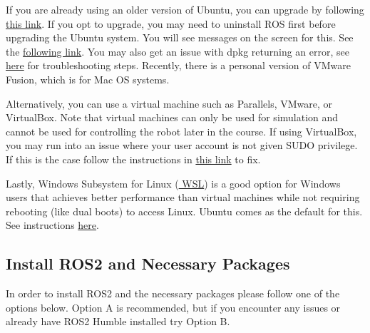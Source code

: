 \documentclass[hidelinks]{article}
\begin{document}
\vspace{0.1in}

If you are already using an older version of Ubuntu, you can upgrade by following \href{https://ubuntu.com/server/docs/upgrade-introduction}{\color{blue}this link}. If you opt to upgrade, you may need to uninstall ROS first before upgrading the Ubuntu system. You will see messages on the screen for this. See the \href{https://answers.ros.org/question/57213/how-i-completely-remove-all-ros-from-my-system/}{\color{blue}following link}. You may also get an issue with dpkg returning an error, see \href{https://phoenixnap.com/kb/fix-sub-process-usr-bin-dpkg-returned-error-code-1}{\color{blue}here} for troubleshooting steps. Recently, there is a personal version of VMware Fusion, which is for Mac OS systems.

\vspace{0.1in}

Alternatively, you can use a virtual machine such as Parallels, VMware, or VirtualBox. Note that virtual machines can only be used for simulation and cannot be used for controlling the robot later in the course. If using VirtualBox, you may run into an issue where your user account is not given SUDO privilege. If this is the case follow the instructions in \href{https://superuser.com/a/1755286}{\color{blue}this link} to fix.

\vspace{0.1in}

Lastly, Windows Subsystem for Linux (\href{https://learn.microsoft.com/en-us/windows/wsl/}{\color{blue} WSL}) is a good option for Windows users that achieves better performance than virtual machines while not requiring rebooting (like dual boots) to access Linux. Ubuntu comes as the default for this. See instructions \href{https://learn.microsoft.com/en-us/windows/wsl/install}{\color{blue} here}.

\subsection{Install ROS2 and Necessary Packages}
In order to install ROS2 and the necessary packages please follow one of the options below. Option A is recommended, but if you encounter any issues or already have ROS2 Humble installed try Option B. 

\vspace{0.1in}

\end{document}
